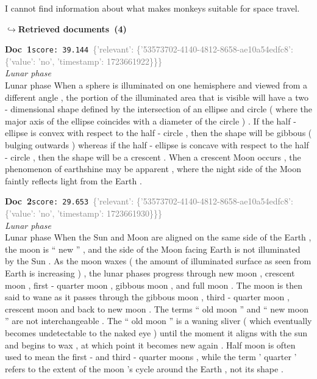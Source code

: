 \documentclass[a4paper,11pt]{article}
\begin{document}
\begin{agentbubble}
I cannot find information about what makes monkeys suitable for space travel. 
\end{agentbubble}
\noindent\hfill{\footnotesize\textcolor{doccolor}{\textbf{$\hookrightarrow$\enspace Retrieved documents~(4)}}}
\begin{docenv}
{\footnotesize\textcolor{doccolor}{\textbf{Doc~1}}}\hfill{\tiny\texttt{score:~39.144}}\ {\tiny\textcolor{gray}{\{'relevant': \{'53573702-4140-4812-8658-ae10a54edfc8': \{'value': 'no', 'timestamp': 1723661922\}\}\}}}\\[3pt]
{\small\textit{Lunar phase}}\\[2pt]
\vspace{2pt}
{\footnotesize Lunar phase
When a sphere is illuminated on one hemisphere and viewed from a different angle , the portion of the illuminated area that is visible will have a two - dimensional shape defined by the intersection of an ellipse and circle ( where the major axis of the ellipse coincides with a diameter of the circle ) . If the half - ellipse is convex with respect to the half - circle , then the shape will be gibbous ( bulging outwards ) whereas if the half - ellipse is concave with respect to the half - circle , then the shape will be a crescent . When a crescent Moon occurs , the phenomenon of earthshine may be apparent , where the night side of the Moon faintly reflects light from the Earth .}
\end{docenv}
\begin{docenv}
{\footnotesize\textcolor{doccolor}{\textbf{Doc~2}}}\hfill{\tiny\texttt{score:~29.653}}\ {\tiny\textcolor{gray}{\{'relevant': \{'53573702-4140-4812-8658-ae10a54edfc8': \{'value': 'no', 'timestamp': 1723661930\}\}\}}}\\[3pt]
{\small\textit{Lunar phase}}\\[2pt]
\vspace{2pt}
{\footnotesize Lunar phase
When the Sun and Moon are aligned on the same side of the Earth , the moon is `` new '' , and the side of the Moon facing Earth is not illuminated by the Sun . As the moon waxes ( the amount of illuminated surface as seen from Earth is increasing ) , the lunar phases progress through new moon , crescent moon , first - quarter moon , gibbous moon , and full moon . The moon is then said to wane as it passes through the gibbous moon , third - quarter moon , crescent moon and back to new moon . The terms `` old moon '' and `` new moon '' are not interchangeable . The `` old moon '' is a waning sliver ( which eventually becomes undetectable to the naked eye ) until the moment it aligns with the sun and begins to wax , at which point it becomes new again . Half moon is often used to mean the first - and third - quarter moons , while the term ' quarter ' refers to the extent of the moon 's cycle around the Earth , not its shape .}
\end{docenv}
\end{document}
